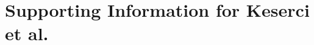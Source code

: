 \documentclass[10pt,letterpaper]{article}
\date{}
\begin{document}
\vspace*{0.2in}

% 
%





\section*{Supporting Information for Keserci et al.}

\end{document}
